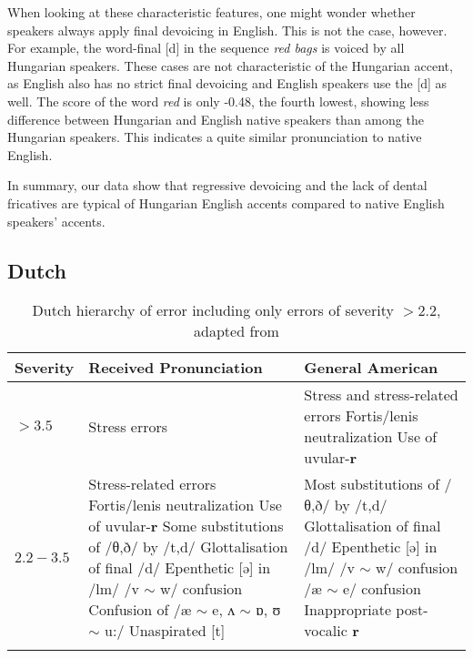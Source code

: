 \documentclass[output=paper]{LSP/langsci}
\begin{document}
When looking at these characteristic features, one might wonder whether speakers always apply final devoicing in English. This is not the case, however. For example, the word-final [d] in the sequence \textit{red bags} is voiced by all Hungarian speakers. These cases are not characteristic of the Hungarian accent, as English also has no strict final devoicing and English speakers use the [d] as well. The score of the word \textit{red} is only -0.48, the fourth lowest, showing less difference between Hungarian and English native speakers than among the Hungarian speakers. This indicates a quite similar pronunciation to native English.

In summary, our data show that regressive devoicing and the lack of dental fricatives are typical of Hungarian English accents compared to native English speakers' accents.

\subsection{Dutch}

\begin{table}[h]
\begin{tabular}{l  p{4.8cm}  p{4.8cm}}
\lsptoprule %
{Severity} & {Received Pronunciation} & {General American} \\ \midrule \midrule
{$> 3.5$} & Stress errors & Stress and stress-related errors \newline Fortis/lenis neutralization \newline Use of uvular-\textbf{r} \\ \midrule
{$2.2-3.5$} & Stress-related errors \newline Fortis/lenis neutralization \newline Use of uvular-\textbf{r} \newline Some substitutions of /θ,ð/ by /t,d/ \newline Glottalisation of final /d/ \newline Epenthetic [ə] in /lm/ \newline /v $\sim$ w/ confusion \newline Confusion of /æ $\sim$ e, ʌ $\sim$ ɒ, ʊ $\sim$ u:/ \newline Unaspirated [t] & Most substitutions of /θ,ð/ by /t,d/ \newline Glottalisation of final /d/ \newline Epenthetic [ə] in /lm/ \newline /v $\sim$ w/ confusion \newline /æ $\sim$ e/ confusion \newline Inappropriate post-vocalic \textbf{r}
\\ 
\lspbottomrule %
\end{tabular}
\caption{Dutch hierarchy of error including only errors of severity $> 2.2$, adapted from \citet{van_den_doel_evaluation_2006}}
\label{tb:doel}
\end{table}
\end{document}
